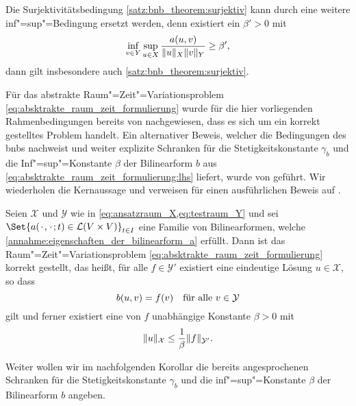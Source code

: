 \documentclass[../main.tex]{subfiles}
\begin{document}
\begin{Bemerkung}
\label{bemerkung:bnb_theorem_inf_sup_statt_surjektiv}
    Die Surjektivitätsbedingung \cref{satz:bnb_theorem:surjektiv} kann durch eine weitere inf"=sup"=Bedingung ersetzt werden, denn existiert ein $\beta' > 0$ mit
    \begin{equation}
        \inf_{v \in Y} \sup_{u \in X} \frac{a(u, v)}{\norm{u}_{X} \norm{v}_{Y}} \geq \beta',
    \end{equation}
    dann gilt insbesondere auch \cref{satz:bnb_theorem:surjektiv}.
\end{Bemerkung}

Für das abstrakte Raum"=Zeit"=Variationsproblem \cref{eq:absktrakte_raum_zeit_formulierung} wurde für die hier vorliegenden Rahmenbedingungen bereits von \textcite[Section XVIII.3]{Dautray:1992by} nachgewiesen, dass es sich um ein korrekt gestelltes Problem handelt.
Ein alternativer Beweis, welcher die Bedingungen des \acl{bnb}s nachweist und weiter explizite Schranken für die Stetigkeitskonstante $\gamma_{b}$ und die Inf"=sup"=Konstante $\beta$ der Bilinearform $b$ aus \cref{eq:absktrakte_raum_zeit_formulierung:lhs} liefert, wurde von \textcite{Schwab:2009ec} geführt.
Wir wiederholen die Kernaussage \cite[Theorem 5.1]{Schwab:2009ec} und verweisen für einen ausführlichen Beweis auf \cite[Appendix A]{Schwab:2009ec}.

\begin{Satz}
\label{satz:ss09:theorem51}
    Seien $\mathcal X$ und $\mathcal Y$ wie in \cref{eq:ansatzraum_X,eq:testraum_Y} und sei $\Set{a(\blank, \blank; t) \in \mathcal L (V \times V)}_{t \in I}$ eine Familie von Bilinearformen, welche \cref{annahme:eigenschaften_der_bilinearform_a} erfüllt.
    Dann ist das Raum"=Zeit"=Variationsproblem \cref{eq:absktrakte_raum_zeit_formulierung} korrekt gestellt, das heißt, für alle $f \in \mathcal Y'$ existiert eine eindeutige Lösung $u \in \mathcal X$, so dass
    \begin{equation}
        b(u, v) = f(v) \quad \fa v \in \mathcal Y
    \end{equation}
    gilt und ferner existiert eine von $f$ unabhängige Konstante $\beta > 0$ mit
    \begin{equation}
        \norm{u}_{\mathcal X} \leq \frac{1}{\beta} \norm{f}_{\mathcal Y'}.
    \end{equation}
\end{Satz}

Weiter wollen wir im nachfolgenden Korollar die bereits angesprochenen Schranken für die Stetigkeitskonstante $\gamma_{b}$ und die inf"=sup"=Konstante $\beta$ der Bilinearform $b$ angeben.
\end{document}
